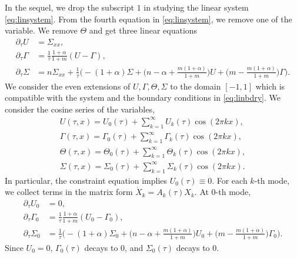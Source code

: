 \documentclass[a4paper,11pt]{article}
\theoremstyle{remark}
\begin{document}
In the sequel, we drop the subscript $1$ in studying the linear system \eqref{eq:linsystem}. From the fourth equation in \eqref{eq:linsystem}, we remove one of the variable. We remove $\Theta$ and get three linear equations
\begin{equation}
 \begin{aligned}
  \partial_\tau U &= \Sigma_{xx},\\
  \partial_\tau\Gamma &= \frac{1}{\tau}\frac{1+\alpha}{1+m}(U-\Gamma),\\
  \partial_\tau\Sigma 
  &= n\Sigma_{xx} +\frac{1}{\tau}\Big( -(1+\alpha)\Sigma + \big(n-\alpha + \frac{m(1+\alpha)}{1+m}\big)U + \big(m - \frac{m(1+\alpha)}{1+m}\big)\Gamma\Big).
 \end{aligned}
\end{equation}
We consider the even extensions of $U,\Gamma,\Theta,\Sigma$ to the domain $[-1,1]$ which is compatible with the system and the boundary conditions in \eqref{eq:linbdry}. We consider the cosine series of the variables,
\begin{align*}
 U(\tau,x) = U_0(\tau) + \sum_{k=1}^\infty U_k(\tau)\cos(2\pi kx),\\
 \Gamma(\tau,x) = \Gamma_0(\tau) + \sum_{k=1}^\infty \Gamma_k(\tau)\cos(2\pi kx),\\
 \Theta(\tau,x) = \Theta_0(\tau) + \sum_{k=1}^\infty \Theta_k(\tau)\cos(2\pi kx),\\
 \Sigma(\tau,x) = \Sigma_0(\tau) + \sum_{k=1}^\infty \Sigma_k(\tau)\cos(2\pi kx).
\end{align*}
In particular, the constraint equation implies $U_0(\tau)\equiv0$. For each $k$-th mode, we collect terms in the matrix form $\dot{X}_k = A_k(\tau)X_k$. At $0$-th mode,
\begin{align*}
   \partial_\tau U_0 &= 0,\\
  \partial_\tau\Gamma_0 &= \frac{1}{\tau}\frac{1+\alpha}{1+m}(U_0-\Gamma_0),\\
  \partial_\tau\Sigma_0 &= \frac{1}{\tau}\Big( -(1+\alpha)\Sigma_0 + \big(n-\alpha + \frac{m(1+\alpha)}{1+m}\big)U_0 + \big(m - \frac{m(1+\alpha)}{1+m}\big)\Gamma_0\Big).
\end{align*}
Since $U_0=0$, $\Gamma_0(\tau)$ decays to $0$, and $\Sigma_0(\tau)$ decays to $0$.
\end{document}

